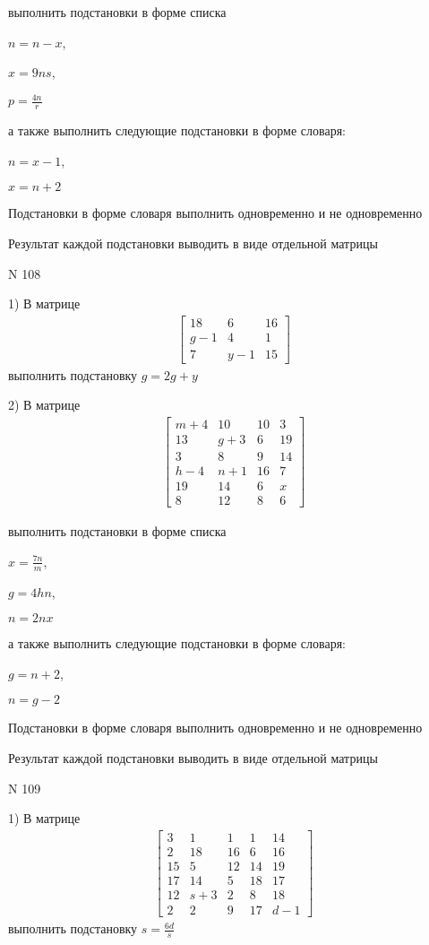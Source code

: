 \documentclass[11pt]{report}
\begin{document}
выполнить подстановки в форме списка

$n=n - x$,

$x=9 n s$,

$p=\frac{4 n}{r}$

а также выполнить следующие подстановки в форме словаря:

$n=x - 1$,

$x=n + 2$


    Подстановки в форме словаря выполнить одновременно и не одновременно


    Результат каждой подстановки выводить в виде отдельной матрицы

\newpage
N 108


    1) В матрице
\begin{align*}
\left[\begin{matrix}18 & 6 & 16\\g - 1 & 4 & 1\\7 & y - 1 & 15\end{matrix}\right]
\end{align*}
выполнить подстановку $g=2 g + y$


    2) В матрице
\begin{align*}
\left[\begin{matrix}m + 4 & 10 & 10 & 3\\13 & g + 3 & 6 & 19\\3 & 8 & 9 & 14\\h - 4 & n + 1 & 16 & 7\\19 & 14 & 6 & x\\8 & 12 & 8 & 6\end{matrix}\right]
\end{align*}

выполнить подстановки в форме списка

$x=\frac{7 n}{m}$,

$g=4 h n$,

$n=2 n x$

а также выполнить следующие подстановки в форме словаря:

$g=n + 2$,

$n=g - 2$


    Подстановки в форме словаря выполнить одновременно и не одновременно


    Результат каждой подстановки выводить в виде отдельной матрицы

\newpage
N 109


    1) В матрице
\begin{align*}
\left[\begin{matrix}3 & 1 & 1 & 1 & 14\\2 & 18 & 16 & 6 & 16\\15 & 5 & 12 & 14 & 19\\17 & 14 & 5 & 18 & 17\\12 & s + 3 & 2 & 8 & 18\\2 & 2 & 9 & 17 & d - 1\end{matrix}\right]
\end{align*}
выполнить подстановку $s=\frac{6 d}{s}$
\end{document}
